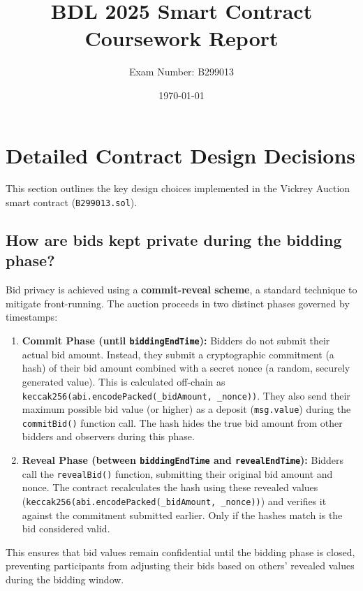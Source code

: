 \documentclass[11pt, a4paper]{article}
\title{BDL 2025 Smart Contract Coursework Report}
\author{Exam Number: B299013} %
\date{\today}
\begin{document}
\maketitle

\section{Detailed Contract Design Decisions}
This section outlines the key design choices implemented in the Vickrey Auction smart contract (\texttt{B299013.sol}).

\subsection{How are bids kept private during the bidding phase?}
Bid privacy is achieved using a \textbf{commit-reveal scheme}, a standard technique to mitigate front-running. The auction proceeds in two distinct phases governed by timestamps:
\begin{enumerate}
    \item \textbf{Commit Phase (until \texttt{biddingEndTime}):} Bidders do not submit their actual bid amount. Instead, they submit a cryptographic commitment (a hash) of their bid amount combined with a secret nonce (a random, securely generated value). This is calculated off-chain as \texttt{keccak256(abi.encodePacked(\_bidAmount, \_nonce))}. They also send their maximum possible bid value (or higher) as a deposit (\texttt{msg.value}) during the \texttt{commitBid()} function call. The hash hides the true bid amount from other bidders and observers during this phase.
    \item \textbf{Reveal Phase (between \texttt{biddingEndTime} and \texttt{revealEndTime}):} Bidders call the \texttt{revealBid()} function, submitting their original bid amount and nonce. The contract recalculates the hash using these revealed values \newline (\texttt{keccak256(abi.encodePacked(\_bidAmount, \_nonce))}) and verifies it against the commitment submitted earlier. Only if the hashes match is the bid considered valid.
\end{enumerate}
This ensures that bid values remain confidential until the bidding phase is closed, preventing participants from adjusting their bids based on others' revealed values during the bidding window.
\end{document}
